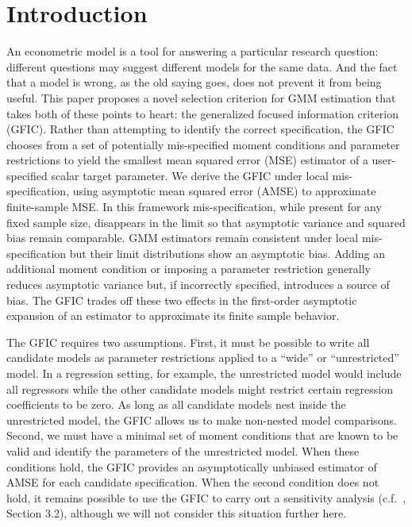 \section{Introduction}


An econometric model is a tool for answering a particular research question: different questions may suggest different models for the same data. 
And the fact that a model is wrong, as the old saying goes, does not prevent it from being useful. 
This paper proposes a novel selection criterion for GMM estimation that takes both of these points to heart: the generalized focused information criterion (GFIC). 
Rather than attempting to identify the correct specification, the GFIC chooses from a set of potentially mis-specified moment conditions and parameter restrictions to yield the smallest mean squared error (MSE) estimator of a user-specified scalar target parameter. 
We derive the GFIC under local mis-specification, using asymptotic mean squared error (AMSE) to approximate finite-sample MSE. 
In this framework mis-specification, while present for any fixed sample size, disappears in the limit so that asymptotic variance and squared bias remain comparable. 
GMM estimators remain consistent under local mis-specification but their limit distributions show an asymptotic bias. 
Adding an additional moment condition or imposing a parameter restriction generally reduces asymptotic variance but, if incorrectly specified, introduces a source of bias.
The GFIC trades off these two effects in the first-order asymptotic expansion of an estimator to approximate its finite sample behavior.

The GFIC requires two assumptions. First, it must be possible to write all candidate models as parameter restrictions applied to a ``wide'' or ``unrestricted'' model. 
In a regression setting, for example, the unrestricted model would include all regressors while the other candidate models might restrict certain regression coefficients to be zero. 
As long as all candidate models nest inside the unrestricted model, the GFIC allows us to make non-nested model comparisons. 
Second, we must have a minimal set of moment conditions that are known to be valid and identify the parameters of the unrestricted model.
When these conditions hold, the GFIC provides an asymptotically unbiased estimator of AMSE for each candidate specification. 
When the second condition does not hold, it remains possible to use the GFIC to carry out a sensitivity analysis (c.f.\ \cite{DiTraglia2012}, Section 3.2), although we will not consider this situation further here. 


